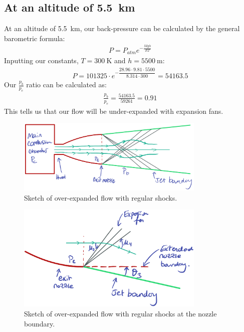 \documentclass[11pt]{article}
\numberwithin{equation}{section}
\begin{document}
\subsection{At an altitude of \SI{5.5}{\kilo\meter}}
At an altitude of \SI{5.5}{\kilo\meter}, our back-pressure can be calculated by the general barometric formula:
\begin{gather}
    P = P_{atm} e^{-\frac{Mgh}{RT}}
\end{gather}
Inputting our constants, $T = \SI{300}{\kelvin}$ and $h = \SI{5500}{\meter}$:
\begin{gather}
    P = 101325 \cdot e^{-\dfrac{28.96\cdot 9.81 \cdot 5500}{8.314\cdot300}} = 54163.5
\end{gather}
Our $\frac{p_b}{p_e}$ ratio can be calculated as:
\begin{gather}
    \frac{p_b}{p_e} = \frac{54163.5}{59261} = 0.91
\end{gather}
This tells us that our flow will be under-expanded with expansion fans.
\begin{figure}[H]
    \centering
    \includegraphics[width = 0.8\textwidth]{./img/underexpanded1.png}
    \caption{Sketch of over-expanded flow with regular shocks.}
\end{figure}
\begin{figure}[H]
    \centering
    \includegraphics[width = 0.8\textwidth]{./img/underexpanded2.png}
    \caption{Sketch of over-expanded flow with regular shocks at the nozzle boundary.}
\end{figure}
\end{document}
